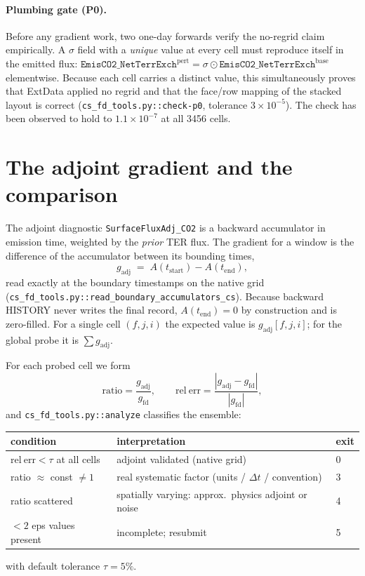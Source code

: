 \documentclass[12pt]{article}
\newcommand{\tend}{t_{\mathrm{end}}}
\newcommand{\tstart}{t_{\mathrm{start}}}
\newcommand{\Adj}{A}
\newcommand{\gfit}{g_{\mathrm{fd}}}
\newcommand{\gadj}{g_{\mathrm{adj}}}
\begin{document}
\paragraph{Plumbing gate (P0).} Before any gradient work, two one-day forwards
verify the no-regrid claim empirically. A $\sigma$ field with a \emph{unique}
value at every cell must reproduce itself in the emitted flux:
$\texttt{EmisCO2\_NetTerrExch}^{\mathrm{pert}} = \sigma \odot
\texttt{EmisCO2\_NetTerrExch}^{\mathrm{base}}$ elementwise. Because each cell
carries a distinct value, this simultaneously proves that ExtData applied no
regrid and that the face/row mapping of the stacked layout is correct
(\texttt{cs\_fd\_tools.py::check-p0}, tolerance $3\times10^{-5}$). The check has
been observed to hold to $1.1\times10^{-7}$ at all 3456 cells.

\section{The adjoint gradient and the comparison}

The adjoint diagnostic \texttt{SurfaceFluxAdj\_CO2} is a backward accumulator in
emission time, weighted by the \emph{prior} TER flux. The gradient for a window
is the difference of the accumulator between its bounding times,
%
\begin{equation}
  \gadj \;=\; \Adj(\tstart) - \Adj(\tend),
  \label{eq:gadj}
\end{equation}
%
read exactly at the boundary timestamps on the native grid
(\texttt{cs\_fd\_tools.py::read\_boundary\_accumulators\_cs}). Because backward
HISTORY never writes the final record, $\Adj(\tend)=0$ by construction and is
zero-filled. For a single cell $(f,j,i)$ the expected value is $\gadj[f,j,i]$; for
the global probe it is $\sum \gadj$.

For each probed cell we form
%
\begin{equation}
  \mathrm{ratio} = \frac{\gadj}{\gfit}, \qquad
  \mathrm{rel\ err} = \frac{|\gadj - \gfit|}{|\gfit|},
\end{equation}
%
and \texttt{cs\_fd\_tools.py::analyze} classifies the ensemble:
%
\begin{center}
\begin{tabular}{lll}
\toprule
condition & interpretation & exit \\
\midrule
$\mathrm{rel\ err} < \tau$ at all cells & adjoint validated (native grid) & 0 \\
ratio $\approx$ const $\ne 1$ & real systematic factor (units / $\Delta t$ / convention) & 3 \\
ratio scattered & spatially varying: approx.\ physics adjoint or noise & 4 \\
$<2$ eps values present & incomplete; resubmit & 5 \\
\bottomrule
\end{tabular}
\end{center}
%
with default tolerance $\tau = 5\%$.
\end{document}
